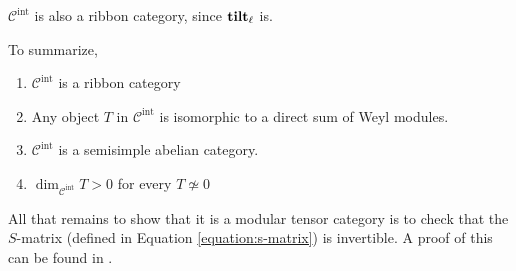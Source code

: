 $\mathcal{C}^\text{int}$ is also a ribbon category, since $\mathbf{tilt}_\ell$ is.

To summarize, 
\begin{prop}
\begin{enumerate}
    \item  $\mathcal{C}^\text{int}$ is a ribbon category
    \item Any object $T$ in $\mathcal{C}^\text{int}$ is isomorphic to a direct sum of Weyl modules.
    \item $\mathcal{C}^\text{int}$ is a semisimple abelian category. 
    \item $\dim_{\mathcal{C}^\text{int}} T > 0$ for every $T \not\simeq 0$
\end{enumerate}
\end{prop}

All that remains to show that it is a modular tensor category is to check that
the $S$-matrix (defined in Equation \ref{equation:s-matrix}) is invertible. A
proof of this can be found in \cite{Kirillov2001}.
